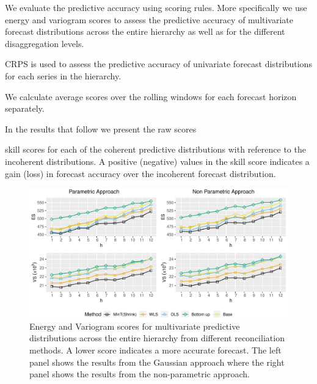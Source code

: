\documentclass[12pt]{article}
\theoremstyle{definition}
\begin{document}
We evaluate the predictive accuracy using scoring rules. More specifically we use energy and variogram scores to assess the predictive accuracy of multivariate forecast distributions across the entire hierarchy as well as for the different disaggregation levels. 

CRPS is used to assess the predictive accuracy of univariate forecast distributions for each series in the hierarchy. 

We calculate average scores over the rolling windows for each forecast horizon separately. 

In the results that follow we present the raw scores 

skill scores for each of the coherent predictive distributions with reference to the incoherent distributions. A positive (negative) values in the skill score indicates a gain (loss) in forecast accuracy over the incoherent forecast distribution.

\begin{figure}
	\centering
	\small
	\includegraphics[width= .95\textwidth]{Empirical-results/Results-ARIMA/Scores_Overall.pdf}
	\caption{Energy and Variogram scores for multivariate predictive distributions across the entire hierarchy from different reconciliation methods. A lower score indicates a more accurate forecast. The left panel shows the results from the Gaussian approach where the right panel shows the results from the non-parametric approach.} \label{fig:EmpResults_AllTS}
\end{figure}
\end{document}
